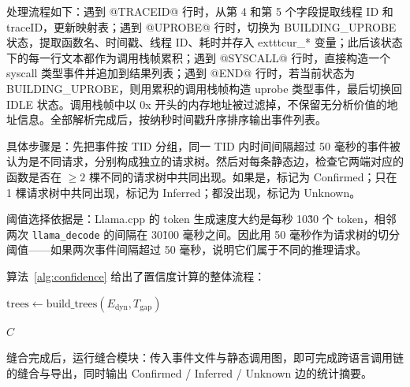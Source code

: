 处理流程如下：遇到 @TRACEID@ 行时，从第 4 和第 5 个字段提取线程 ID 和 traceID，更新映射表；遇到 @UPROBE@ 行时，切换为 BUILDING\_UPROBE 状态，提取函数名、时间戳、线程 ID、耗时并存入 	exttt{cur\_*} 变量；此后该状态下的每一行文本都作为调用栈帧累积；遇到 @SYSCALL@ 行时，直接构造一个 syscall 类型事件并追加到结果列表；遇到 @END@ 行时，若当前状态为 BUILDING\_UPROBE，则用累积的调用栈帧构造 uprobe 类型事件，最后切换回 IDLE 状态。调用栈帧中以 0x 开头的内存地址被过滤掉，不保留无分析价值的地址信息。全部解析完成后，按纳秒时间戳升序排序输出事件列表。

具体步骤是：先把事件按 TID 分组，同一 TID 内时间间隔超过 50 毫秒的事件被认为是不同请求，分别构成独立的请求树。然后对每条静态边，检查它两端对应的函数是否在 $\ge 2$ 棵不同的请求树中共同出现。如果是，标记为 Confirmed；只在 1 棵请求树中共同出现，标记为 Inferred；都没出现，标记为 Unknown。

阈值选择依据是：Llama.cpp 的 token 生成速度大约是每秒 10\~30 个 token，相邻两次 \texttt{llama\_decode} 的间隔在 30\~100 毫秒之间。因此用 50 毫秒作为请求树的切分阈值——如果两次事件间隔超过 50 毫秒，说明它们属于不同的推理请求。

算法~\ref{alg:confidence} 给出了置信度计算的整体流程：


\begin{algorithm}[H]
\caption{置信度计算流程}
\label{alg:confidence}
\DontPrintSemicolon
{}

\BlankLine
$\text{trees} \leftarrow \text{build\_trees}(E_{\text{dyn}}, T_{\text{gap}})$ 

\BlankLine
{}
\Return $C$
\end{algorithm}

缝合完成后，运行缝合模块：传入事件文件与静态调用图，即可完成跨语言调用链的缝合与导出，同时输出 Confirmed / Inferred / Unknown 边的统计摘要。


